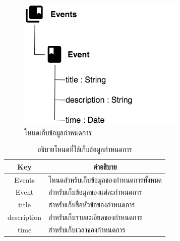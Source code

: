 \newpage
\begin{figure}[H]
	\centering
	\includegraphics[width=0.5\columnwidth]
	{Figures/3/DB/nodeEvent}
	\caption{โหนดเก็บข้อมูลกำหนดการ}
	\label{Fig:DB4}
\end{figure}
\begin{table}[H]
	\centering
	\caption{อธิบายโหนดที่ใช้เก็บข้อมูลกำหนดการ}
	\label{my-label1}
	\begin{tabular}{|c|p{10cm}|}
		\hline
		\multicolumn{1}{|c|}{\textbf{Key}} & \multicolumn{1}{c|}{\textbf{คำอธิบาย}} \\ \hline
		Events & โหนดสำหรับเก็บข้อมูลของกำหนดการทั้งหมด \\ \hline
		Event & สำหรับเก็บข้อมูลของแต่ละกำหนดการ \\ \hline
		title & สำหรับเก็บชื่อหัวข้อของกำหนดการ \\ \hline
		description & สำหรับเก็บรายละเอียดของกำหนดการ\\ \hline
		time & สำหรับเก็บเวลาของกำหนดการ\\ \hline
	\end{tabular}
\end{table}

